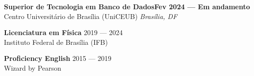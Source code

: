 \justifying

\textbf{Superior de Tecnologia em Banco de Dados}\hfill \textbf{Fev 2024 --- Em andamento} \\
Centro Universitário de Brasília (UniCEUB) \hfill \textit{Brasília, DF}
\vspace{0.6em}

\noindent
\textbf{Licenciatura em Física} \hfill 2019 --- 2024 \\
Instituto Federal de Brasília (IFB)
\vspace{0.6em}

\noindent
\textbf{Proficiency English} \hfill 2015 --- 2019 \\
Wizard by Pearson
\vspace{0.6em}
